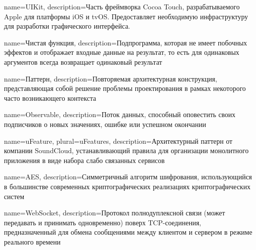 

{
  name={UIKit},
  description={Часть фреймворка Cocoa Touch, разрабатываемого Apple для платформы iOS и tvOS. Предоставляет необходимую инфраструктуру для разработки графического интерфейса.}
}

{
  name={Чистая функция},
  description={Подпрограмма, которая не имеет побочных эффектов и отображает входные данные на результат, то есть для одинаковых аргументов всегда возвращает одинаковый результат}
}

{
  name={Паттерн},
  description={Повторяемая архитектурная конструкция, представляющая собой решение проблемы проектирования в рамках некоторого часто возникающего контекста}
}

{
  name=Observable,
  description={Поток данных, способный оповестить своих подписчиков о новых значениях, ошибке или успешном окончании}
}

{
  name=uFeature,
  plural={uFeatures},
  description={Архитектурный паттерн от компании SoundCloud, устанавливающий правила для организации монолитного приложения в виде набора слабо связанных сервисов}
}

{
  name=AES,
  description={Симметричный алгоритм шифрования, использующийся в большинстве современных криптографических реализациях криптографических систем}
}

{
  name=WebSocket,
  description={Протокол полнодуплексной связи (может передавать и принимать одновременно) поверх TCP-соединения, предназначенный для обмена сообщениями между клиентом и сервером в режиме реального времени}
}


\glsaddall



